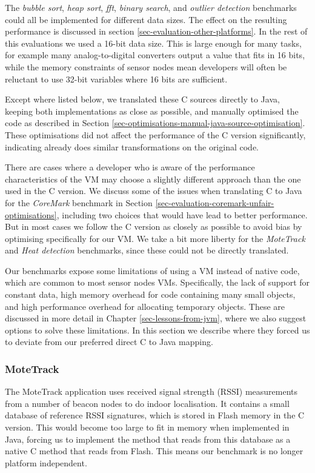 The \emph{bubble sort}, \emph{heap sort}, \emph{fft}, \emph{binary search}, and \emph{outlier detection} benchmarks could all be implemented for different data sizes. The effect on the resulting performance is discussed in section \ref{sec-evaluation-other-platforms}. In the rest of this evaluations we used a 16-bit data size. This is large enough for many tasks, for example many analog-to-digital converters output a value that fits in 16 bits, while the memory constraints of sensor nodes mean developers will often be reluctant to use 32-bit variables where 16 bits are sufficient.

Except where listed below, we translated these C sources directly to Java, keeping both implementations as close as possible, and manually optimised the code as described in Section \ref{sec-optimisations-manual-java-source-optimisation}. These optimisations did not affect the performance of the C version significantly, indicating  already does similar transformations on the original code.

There are cases where a developer who is aware of the performance characteristics of the VM may choose a slightly different approach than the one used in the C version. We discuss some of the issues when translating C to Java for the \emph{CoreMark} benchmark in Section \ref{sec-evaluation-coremark-unfair-optimisations}, including two choices that would have lead to better performance. But in most cases we follow the C version as closely as possible to avoid bias by optimising specifically for our VM. We take a bit more liberty for the \emph{MoteTrack} and \emph{Heat detection} benchmarks, since these could not be directly translated.

Our benchmarks expose some limitations of using a VM instead of native code, which are common to most sensor nodes VMs. Specifically, the lack of support for constant data, high memory overhead for code containing many small objects, and high performance overhead for allocating temporary objects. These are discussed in more detail in Chapter \ref{sec-lessons-from-jvm}, where we also suggest options to solve these limitations. In this section we describe where they forced us to deviate from our preferred direct C to Java mapping.


\subsubsection{MoteTrack}
\label{sec-evaluation-benchmark-implementation-motetrack}
The MoteTrack application uses received signal strength (RSSI) measurements from a number of beacon nodes to do indoor localisation. It contains a small database of reference RSSI signatures, which is stored in Flash memory in the C version. This would become too large to fit in memory when implemented in Java, forcing us to implement the method that reads from this database as a native C method that reads from Flash. This means our benchmark is no longer platform independent.

